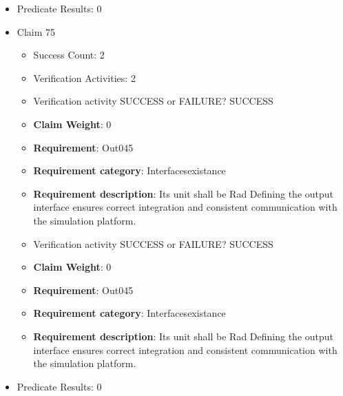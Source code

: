 \documentclass{article}
\begin{document}
\begin{itemize}
\begin{itemize}
					\item Verification activity SUCCESS or FAILURE? SUCCESS
					\item \textbf{Claim Weight}: 0
						\item \textbf{Requirement}: Out044 
						\item \textbf{Requirement category}: Interfacesexistance 
						\item \textbf{Requirement description}: Its unit shall be noUnit Defining the output interface ensures correct integration and consistent communication with the simulation platform.
					
				\end{itemize}
				
									    
				\item Predicate Results: 0

  				  \item Claim 75
				\begin{itemize}
			    	\item Success Count: 2 
			    	\item Verification Activities: 2
					\item Verification activity SUCCESS or FAILURE? SUCCESS
					\item \textbf{Claim Weight}: 0
						\item \textbf{Requirement}: Out045 
						\item \textbf{Requirement category}: Interfacesexistance 
						\item \textbf{Requirement description}: Its unit shall be Rad Defining the output interface ensures correct integration and consistent communication with the simulation platform.
					
					\item Verification activity SUCCESS or FAILURE? SUCCESS
					\item \textbf{Claim Weight}: 0
						\item \textbf{Requirement}: Out045 
						\item \textbf{Requirement category}: Interfacesexistance 
						\item \textbf{Requirement description}: Its unit shall be Rad Defining the output interface ensures correct integration and consistent communication with the simulation platform.
					
				\end{itemize}
				
									    
				\item Predicate Results: 0


\end{itemize}
\end{document}
